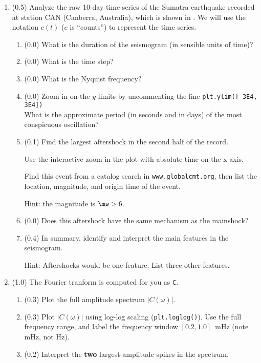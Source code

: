 \documentclass[11pt,titlepage,fleqn]{article}
\newcommand{\tfileresponse}{{\tt hw\_sumatraA\_CAN\_response.ipynb}}
\begin{document}
\begin{enumerate}



\item (0.5) Analyze the raw 10-day time series of the Sumatra earthquake recorded at station CAN (Canberra, Australia), which is shown in . We will use the notation $c(t)$ ($c$ is ``counts'') to represent the time series.

\begin{enumerate}
\item (0.0) What is the duration of the seismogram (in sensible units of time)?
\item (0.0) What is the time step?
\item (0.0) What is the Nyquist frequency?
\item (0.0) Zoom in on the $y$-limits by uncommenting the line \verb+plt.ylim([-3E4, 3E4])+ \\
What is the approximate period (in seconds and in days) of the most conspicuous oscillation?

\item (0.1) Find the largest aftershock in the second half of the record.

Use the interactive zoom in the plot with absolute time on the x-axis.

Find this event from a catalog search in \verb+www.globalcmt.org+, then list the location, magnitude, and origin time of the event.

Hint: the magnitude is $\mw > 6$.

\item (0.0) Does this aftershock have the same mechanism as the mainshock?
\item (0.4) In summary, identify and interpret the main features in the seismogram.

Hint: Aftershocks would be one feature. List three other features.
\end{enumerate}


\item (1.0) The Fourier tranform is computed for you as \verb+C+.
\begin{enumerate}
\item (0.3) Plot the full amplitude spectrum $|C(\omega)|$.
\item (0.3) Plot $|C(\omega)|$ using log-log scaling (\verb+plt.loglog()+). Use the full frequency range, and label the frequency window $[0.2,1.0]$~mHz (note mHz, not Hz).
\item (0.2) Interpret the {\bf two} largest-amplitude spikes in the spectrum.


\end{enumerate}
\end{enumerate}
\end{document}
